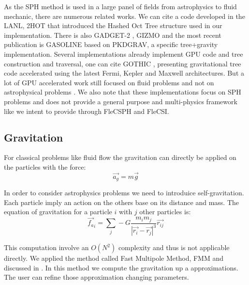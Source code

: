 As the SPH method is used in a large panel of fields from astrophysics to fluid mechanic, there are numerous related works. 
We can cite a code developed in the LANL, 2HOT \cite{warren20132hot} that introduced the Hashed Oct Tree structure used in our implementation. 
There is also GADGET-2 \cite{springel2005cosmological}, GIZMO \cite{hopkins2014gizmo} and the most recent publication is GASOLINE \cite{wadsley2017gasoline2} based on PKDGRAV, a specific tree+gravity implementation. 
Several implementations already implement GPU code and tree construction and traversal, one can cite GOTHIC \cite{miki2017gothic}, presenting gravitational tree code accelerated using the latest Fermi, Kepler and Maxwell architectures. But a lot of GPU accelerated work still focused on fluid problems and not on astrophysical problems  \cite{harada2007smoothed,crespo2011gpus}.
We also note that these implementations focus on SPH problems and does not provide a general purpose and multi-physics framework like we intent to provide through FleCSPH and FleCSI. 

\subsection{Gravitation}
For classical problems like fluid flow the gravitation can directly be applied on the particles with the force:
\begin{equation}
	\vec{a_g} = m\vec{g}
\end{equation}

In order to consider astrophysics problems we need to introduice self-gravitation. 
Each particle imply an action on the others base on its distance and mass. 
The equation of gravitation for a particle $i$ with $j$ other particles is: 
\begin{equation}
	\vec{f_a}_i = \sum_j -G \frac{m_i m_j}{|\vec{r_i}-\vec{r_j}|^3} \vec{r_{ij}}
	\label{eq:gravitation}
\end{equation}

This computation involve an $O(N^2)$ complexity and thus is not applicable directly. 
We applied the method called Fast Multipole Method, FMM and discussed in \cite{beatson1997short}.
In this method we compute the gravitation up a approximations. 
The user can refine those approximation changing parameters. 

